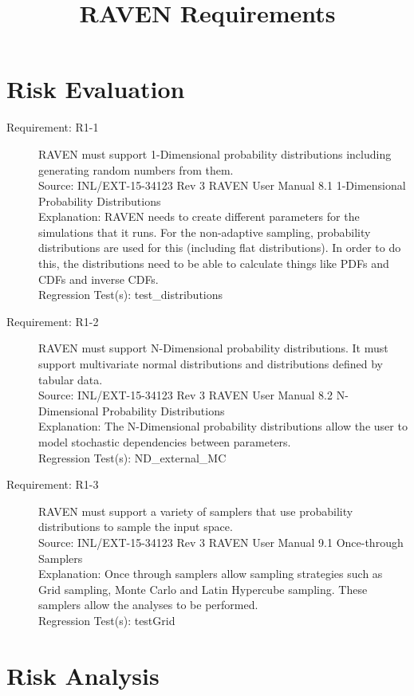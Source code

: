 \documentclass{article}
\title{RAVEN Requirements}
\newcommand{\requirement}[5]{\item[Requirement: #1] #2 \\Source: #3\\Explanation: #4\\Regression Test(s): #5}
\begin{document}
\maketitle

\section{Risk Evaluation}

\begin{description}

\requirement{R1-1}{RAVEN must support 1-Dimensional probability distributions including generating random numbers from them.}
{INL/EXT-15-34123 Rev 3 RAVEN User Manual 8.1 1-Dimensional Probability Distributions}
{RAVEN needs to create different parameters for the simulations that it runs.  For the non-adaptive sampling, probability distributions are used for this (including flat distributions).  In order to do this, the distributions need to be able to calculate things like PDFs and CDFs and inverse CDFs.}
{test\_distributions}

\requirement{R1-2}{RAVEN must support N-Dimensional probability distributions.  It must support multivariate normal distributions and distributions defined by tabular data.}
{INL/EXT-15-34123 Rev 3 RAVEN User Manual 8.2 N-Dimensional Probability Distributions}
{The N-Dimensional probability distributions allow the user to model stochastic dependencies between parameters.}
{ND\_external\_MC}

\requirement{R1-3}{RAVEN must support a variety of samplers that use probability distributions to sample the input space.}
{INL/EXT-15-34123 Rev 3 RAVEN User Manual 9.1 Once-through Samplers}
{Once through samplers allow sampling strategies such as Grid sampling, Monte Carlo and Latin Hypercube sampling.  These samplers allow the analyses to be performed.}
{testGrid}

\end{description}

\section{Risk Analysis}
\end{document}
